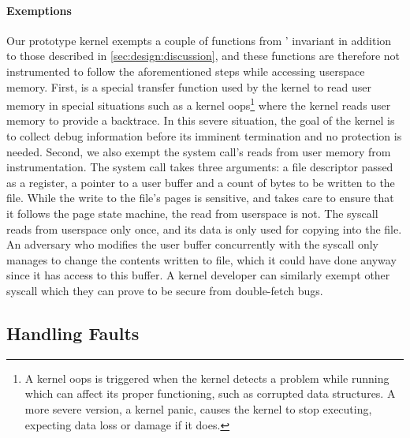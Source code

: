 \documentclass[letterpaper,twocolumn,10pt]{article}
\begin{document}
\paragraph{Exemptions}
Our prototype \midas kernel exempts a couple of functions 
from \midas' invariant in addition to those described in 
\autoref{sec:design:discussion}, and these functions are 
therefore not instrumented 
to follow the aforementioned steps while accessing userspace
memory. 
First,  is a special 
transfer function used by the kernel to 
read user memory in special situations such as a kernel 
oops\footnote{A kernel oops is triggered when the kernel detects a 
problem while running which can affect its proper functioning, such 
as corrupted data structures. 
A more severe version, a kernel panic, causes the kernel to stop 
executing, expecting data loss or damage if it does.}
where the kernel reads user memory to provide a backtrace. 
In this severe situation, the goal of the kernel is to collect debug 
information before its imminent termination and no \tocttou protection 
is needed.
Second, we also exempt the  system 
call's reads from user memory from instrumentation.
The  system call takes three arguments: a 
file descriptor passed as a register, a pointer to a user 
buffer and a count of bytes to be written to the file.
While the write to the file's pages is sensitive, and 
\midas takes care to ensure that it follows the page state 
machine, the read from userspace is not. 
The syscall reads from userspace only once, and its data 
is only used for copying into the file.
An adversary who modifies the user buffer concurrently with 
the syscall only manages to change the contents written to 
file, which it could have done anyway since it has access to 
this buffer.
A kernel developer can similarly exempt other syscall which 
they can prove to be secure from double-fetch bugs.


\subsection{Handling Faults}
\end{document}
